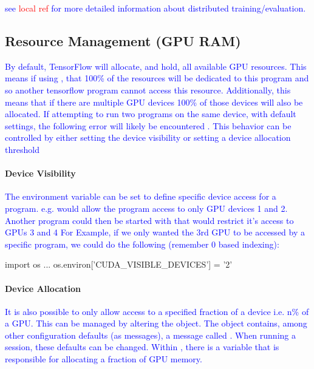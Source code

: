 \textcolor{blue}{see \textcolor{red}{local ref} for more detailed information about distributed training/evaluation.}


\subsection{Resource Management (GPU RAM)}

\textcolor{blue}{By default, TensorFlow will allocate, and hold, all available GPU resources. This means if using , that 100\% of the resources will be dedicated to this program and so another tensorflow program cannot access this resource. Additionally, this means that if there are multiple GPU devices 100\% of those devices will also be allocated. If attempting to run two programs on the same device, with default settings, the following error will likely be encountered . This behavior can be controlled by either setting the device visibility or setting a device allocation threshold}

\paragraph{Device Visibility}

\textcolor{blue}{The environment variable  can be set to define specific device access for a program. e.g.  would allow the program access to only GPU devices 1 and 2.  Another program could then be started with  that would restrict it's access to GPUs 3 and 4}
\textcolor{blue}{For Example, if we only wanted the 3rd GPU to be accessed by a specific program, we could do the following (remember 0 based indexing):}

\begin{python}
import os
...
os.environ['CUDA_VISIBLE_DEVICES'] = '2'
\end{python}



\paragraph{Device Allocation}

\textcolor{blue}{It is also possible to only allow access to a specified fraction of a device i.e. n\% of a GPU.  This can be managed by altering the  object. The  object contains, among other configuration defaults (as messages), a message called . When running a session, these defaults can be changed. Within , there is a variable  that is responsible for allocating a fraction of GPU memory.}

